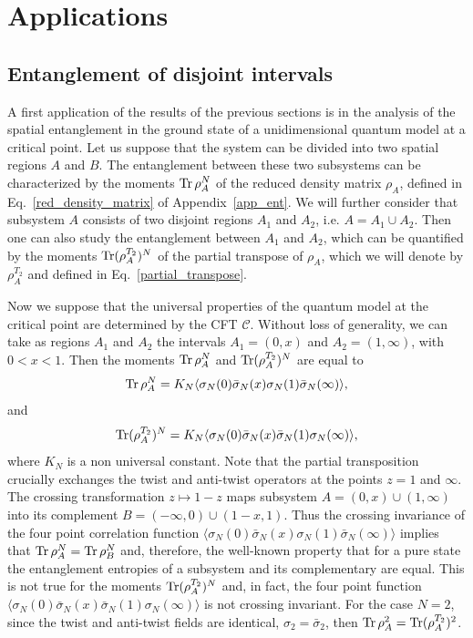 \documentclass[a4paper,11pt]{article}
\def\Tr{\mathop{\mbox{\normalfont Tr}}\nolimits}
\begin{document}
\section{Applications}\label{sec:num_bootstrap}

\subsection{Entanglement of disjoint intervals}

A first application of the results of the previous sections is in 
the analysis of the spatial entanglement in the ground state of a 
unidimensional quantum model at a critical point. Let us suppose that 
the system can be divided into two spatial regions $A$ and $B$. The entanglement
between these two subsystems can be characterized by the moments $\Tr\rho_A^N$
of the reduced density matrix $\rho_A$, defined in Eq.~\eqref{red_density_matrix} 
of Appendix~\ref{app_ent}. We will further consider that subsystem $A$ consists 
of two disjoint regions $A_1$ and $A_2$, i.e. $A=A_1\cup A_2$. Then one can also 
study the entanglement between $A_1$ and $A_2$, which can be quantified by the moments 
$\Tr (\rho_A^{T_2})^N$ of the partial transpose of $\rho_A$, which we will denote by $\rho_A^{T_2}$
and defined in Eq.~\eqref{partial_transpose}.

Now we suppose that the universal properties of the quantum model at the critical 
point are determined by the CFT $\mathcal{C}$. Without loss of generality, we can 
take as regions $A_1$ and $A_2$ the intervals $A_1=(0, x)$ and $A_2=(1, \infty)$, 
with $0<x<1$. Then the moments $\Tr \rho_A^N $ and $\Tr (\rho_A^{T_2})^N$ are equal to 
 \begin{equation}\label{red_mat_ft}
 \Tr\rho_A^N=K_N\langle \sigma_N(0)\bar{\sigma}_N(x)\sigma_N(1)\bar{\sigma}_N(\infty)\rangle,
 \end{equation}
 and
 \begin{equation}\label{partial_trans_ft}
 \Tr(\rho_A^{T_2})^N=K_N\langle \sigma_N(0)\bar{\sigma}_N(x)\bar{\sigma}_N(1)\sigma_N(\infty)\rangle,
 \end{equation}
where $K_N$ is a non universal constant. Note that the partial transposition crucially exchanges the twist and anti-twist operators 
at the points $z=1$ and $\infty$. The crossing transformation $z\mapsto 1-z$ maps subsystem 
$A=(0, x)\cup(1, \infty)$ into its complement $B=(-\infty, 0)\cup(1-x, 1)$. Thus
the crossing invariance of the four point correlation function $\langle \sigma_N(0)
\bar{\sigma}_N(x) \sigma_N(1) \bar{\sigma}_N(\infty)\rangle$ implies that $\Tr\rho_A^N=\Tr\rho_B^N$
and, therefore, the well-known property that for a pure state the entanglement entropies of a 
subsystem and its complementary are equal. This is not true for the moments $\Tr(\rho_A^{T_2})^N$
and, in fact, the four point function $ \langle \sigma_N(0)\bar{\sigma}_N(x)\bar{\sigma}_N(1)\sigma_N(\infty)\rangle$
is not crossing invariant. For the case $N=2$, since the twist and anti-twist fields are identical, $\sigma_2=\bar{\sigma}_2$, 
then $\Tr\rho_A^2=\Tr(\rho_A^{T_2})^2$. 
\end{document}

